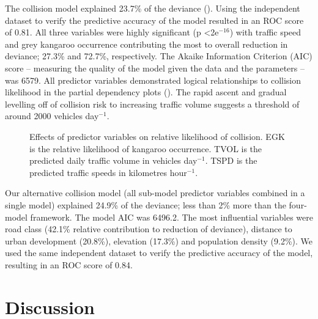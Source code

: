 The collision model explained 23.7\% of the deviance (). Using the independent dataset to verify the predictive accuracy of the model resulted in an ROC score of 0.81.  All three variables were highly significant (p \textless 2e$^{-16}$) with traffic speed and grey kangaroo occurrence contributing the most to overall reduction in deviance; 27.3\% and 72.7\%, respectively.  The Akaike Information Criterion (AIC) score -- measuring the quality of the model given the data and the parameters -- was 6579.  All predictor variables demonstrated logical relationships to collision likelihood in the partial dependency plots (). The rapid ascent and gradual levelling off of collision risk to increasing traffic volume suggests a threshold of around 2000 vehicles day$^{-1}$.

\begin{figure*}[htp]
  \centering
  \caption[Effects of predictor variables on relative likelihood of collision]{Effects of predictor variables on relative likelihood of collision. EGK is the relative likelihood of kangaroo occurrence. TVOL is the predicted daily traffic volume in vehicles day$^{-1}$. TSPD is the predicted traffic speeds in kilometres hour$^{-1}$.}
  \label{egk_effects}
\end{figure*}

Our alternative collision model (all sub-model predictor variables combined in a single model) explained 24.9\% of the deviance; less than 2\% more than the four-model framework.  The model AIC was 6496.2. The most influential variables were road class (42.1\% relative contribution to reduction of deviance), distance to urban development (20.8\%), elevation (17.3\%) and population density (9.2\%). We used the same independent dataset to verify the predictive accuracy of the model, resulting in an ROC score of 0.84.

\section{Discussion}

